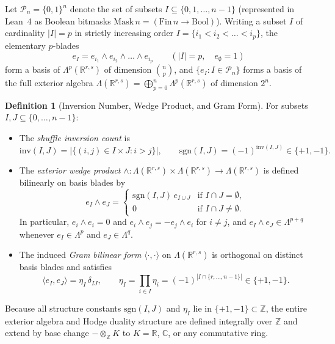 \documentclass[11pt]{article}
\theoremstyle{definition}
\newtheorem{definition}[theorem]{Definition}
\newcommand{\R}{\mathbb{R}}
\newcommand{\Z}{\mathbb{Z}}
\newcommand{\C}{\mathbb{C}}
\newcommand{\inv}{\mathrm{inv}}
\newcommand{\sgn}{\mathrm{sgn}}
\begin{document}
Let $\mathcal{P}_n = \{0, 1\}^n$ denote the set of subsets $I \subseteq \{0, 1, \dots, n-1\}$ (represented in Lean~4 as Boolean bitmasks $\mathrm{Mask}\,n = (\mathrm{Fin}\,n \to \mathrm{Bool})$). Writing a subset $I$ of cardinality $|I| = p$ in strictly increasing order $I = \{i_1 < i_2 < \dots < i_p\}$, the elementary $p$-blades
\[
  e_I = e_{i_1} \wedge e_{i_2} \wedge \dots \wedge e_{i_p} \qquad (|I| = p,\quad e_\emptyset = 1)
\]
form a basis of $\Lambda^p(\R^{r,s})$ of dimension $\binom{n}{p}$, and $\{e_I : I \in \mathcal{P}_n\}$ forms a basis of the full exterior algebra $\Lambda(\R^{r,s}) = \bigoplus_{p=0}^n \Lambda^p(\R^{r,s})$ of dimension $2^n$.

\begin{definition}[Inversion Number, Wedge Product, and Gram Form]\label{def:exterior-structures}
For subsets $I, J \subseteq \{0, \dots, n-1\}$:
\begin{itemize}
  \item[(i)] The \emph{shuffle inversion count} is
  \[
    \inv(I, J) = \bigl|\{(i, j) \in I \times J : i > j\}\bigr|, \qquad \sgn(I, J) = (-1)^{\inv(I, J)} \in \{+1, -1\}.
  \]
  \item[(ii)] The \emph{exterior wedge product} $\wedge : \Lambda(\R^{r,s}) \times \Lambda(\R^{r,s}) \to \Lambda(\R^{r,s})$ is defined bilinearly on basis blades by
  \[
    e_I \wedge e_J = \begin{cases}
      \sgn(I, J)\,e_{I \cup J} & \text{if } I \cap J = \emptyset,\\
      0 & \text{if } I \cap J \neq \emptyset.
    \end{cases}
  \]
  In particular, $e_i \wedge e_i = 0$ and $e_i \wedge e_j = -e_j \wedge e_i$ for $i \neq j$, and $e_I \wedge e_J \in \Lambda^{p+q}$ whenever $e_I \in \Lambda^p$ and $e_J \in \Lambda^q$.
  \item[(iii)] The induced \emph{Gram bilinear form} $\langle \cdot, \cdot \rangle$ on $\Lambda(\R^{r,s})$ is orthogonal on distinct basis blades and satisfies
  \[
    \langle e_I, e_J \rangle = \eta_I\,\delta_{IJ}, \qquad
    \eta_I = \prod_{i \in I} \eta_i = (-1)^{|I \cap \{r, \dots, n-1\}|} \in \{+1, -1\}.
  \]
\end{itemize}
\end{definition}

Because all structure constants $\sgn(I, J)$ and $\eta_I$ lie in $\{+1, -1\} \subset \Z$, the entire exterior algebra and Hodge duality structure are defined integrally over $\Z$ and extend by base change $-\otimes_\Z K$ to $K = \R$, $\C$, or any commutative ring.
\end{document}
